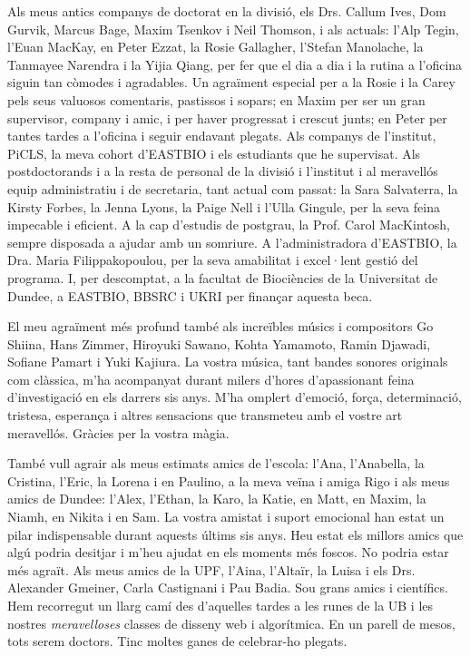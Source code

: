 Als meus antics companys de doctorat en la divisió, els Drs. Callum Ives, Dom Gurvik, Marcus Bage, Maxim Tsenkov i Neil Thomson, i als actuals: l'Alp Tegin, l'Euan MacKay, en Peter Ezzat, la Rosie Gallagher, l'Stefan Manolache, la Tanmayee Narendra i la Yijia Qiang, per fer que el dia a dia i la rutina a l'oficina siguin tan còmodes i agradables. Un agraïment especial per a la Rosie i la Carey pels seus valuosos comentaris, pastissos i sopars; en Maxim per ser un gran supervisor, company i amic, i per haver progressat i crescut junts; en Peter per tantes tardes a l'oficina i seguir endavant plegats. Als companys de l'institut, PiCLS, la meva cohort d'EASTBIO i els estudiants que he supervisat. Als postdoctorands i a la resta de personal de la divisió i l'institut i al meravellós equip administratiu i de secretaria, tant actual com passat: la Sara Salvaterra, la Kirsty Forbes, la Jenna Lyons, la Paige Nell i l'Ulla Gingule, per la seva feina impecable i eficient. A la cap d'estudis de postgrau, la Prof. Carol MacKintosh, sempre disposada a ajudar amb un somriure. A l'administradora d'EASTBIO, la Dra. Maria Filippakopoulou, per la seva amabilitat i excel·lent gestió del programa. I, per descomptat, a la facultat de Biociències de la Universitat de Dundee, a EASTBIO, BBSRC i UKRI per finançar aquesta beca.

El meu agraïment més profund també als increïbles músics i compositors Go Shiina, Hans Zimmer, Hiroyuki Sawano, Kohta Yamamoto, Ramin Djawadi, Sofiane Pamart i Yuki Kajiura. La vostra música, tant bandes sonores originals com clàssica, m'ha acompanyat durant milers d'hores d'apassionant feina d'investigació en els darrers sis anys. M'ha omplert d'emoció, força, determinació, tristesa, esperança i altres sensacions que transmeteu amb el vostre art meravellós. Gràcies per la vostra màgia.

També vull agrair als meus estimats amics de l'escola: l'Ana, l'Anabella, la Cristina, l'Eric, la Lorena i en Paulino, a la meva veïna i amiga Rigo i als meus amics de Dundee: l'Alex, l'Ethan, la Karo, la Katie, en Matt, en Maxim, la Niamh, en Nikita i en Sam. La vostra amistat i suport emocional han estat un pilar indispensable durant aquests últims sis anys. Heu estat els millors amics que algú podria desitjar i m'heu ajudat en els moments més foscos. No podria estar més agraït. Als meus amics de la UPF, l'Aina, l'Altaïr, la Luisa i els Drs. Alexander Gmeiner, Carla Castignani i Pau Badia. Sou grans amics i científics. Hem recorregut un llarg camí des d'aquelles tardes a les runes de la UB i les nostres \textit{meravelloses} classes de disseny web i algorítmica. En un parell de mesos, tots serem doctors. Tinc moltes ganes de celebrar-ho plegats.

